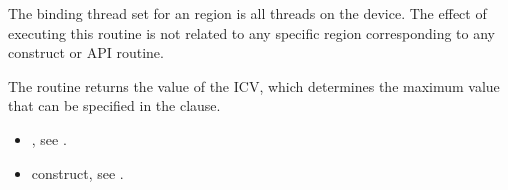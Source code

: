 \binding

The binding thread set for an  region is all threads
on the device. The effect of executing this routine is not related to any specific region
corresponding to any construct or API routine.

\effect

The  routine returns the value of the 
ICV, which determines the maximum value that can be specified in the  clause.

\crossreferences

\begin{itemize}
\item {}, see 
.

\item {} construct, see 
. 
\end{itemize}










